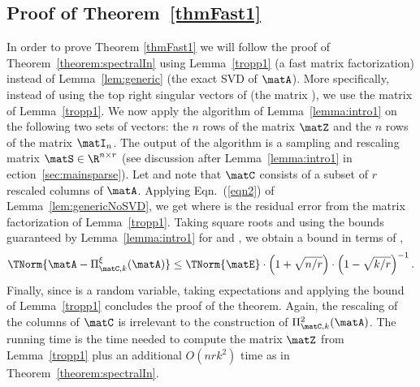 \subsection{Proof of Theorem~\ref{thmFast1}} In order to prove Theorem \ref{thmFast1} we will follow the proof of Theorem~\ref{theorem:spectralIn} using Lemma~\ref{tropp1} (a fast matrix factorization) instead of Lemma~\ref{lem:generic} (the exact SVD of $\matA$). More specifically, instead of using the top  right singular vectors of \math{\matA} (the matrix ), we use the matrix  of Lemma~\ref{tropp1}. We now apply the algorithm of Lemma~\ref{lemma:intro1}
on the following two sets of vectors: the $n$ rows of the matrix $\matZ$ and the $n$ rows of the matrix $\matI_n$. The output of the algorithm is a sampling and rescaling matrix $\matS \in {\R}^{n \times r}$ (see discussion after Lemma~\ref{lemma:intro1} in ection~\ref{sec:mainsparse}). Let \math{\matC=\matA \matS} and note that $\matC$ consists of a subset of $r$ rescaled
 columns of $\matA$.
Applying Eqn.~(\ref{eqn2}) of Lemma~\ref{lem:genericNoSVD}, we get
where \math{\matE} is the residual error from the matrix factorization of Lemma~\ref{tropp1}. Taking square roots and using the bounds guaranteed by Lemma~\ref{lemma:intro1} for  and , we obtain a bound in terms of ,
$$ \TNorm{\matA - \Pi^{\xi}_{\matC,k}(\matA)} \le \TNorm{\matE} \cdot \left(1+\sqrt{n/r} \right) \cdot \left( 1 - \sqrt{ k/r } \right)^{-1}.$$
Finally, since \math{\matE} is a random variable, taking expectations and applying the bound of Lemma~\ref{tropp1} concludes the proof of the theorem. Again, the rescaling of the columns of $\matC$ is irrelevant to the construction of $\Pi_{\matC,k}^2(\matA)$. The running time is the time needed to compute the matrix $\matZ$ from Lemma~\ref{tropp1} plus an additional $O(nrk^2)$ time as in Theorem~\ref{theorem:spectralIn}.

